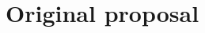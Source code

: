 
\cleardoublepage

\nocite{*}
\printbibliography[heading=bibintoc]

\appendix

\cleardoublepage
\chapter{Original proposal}


